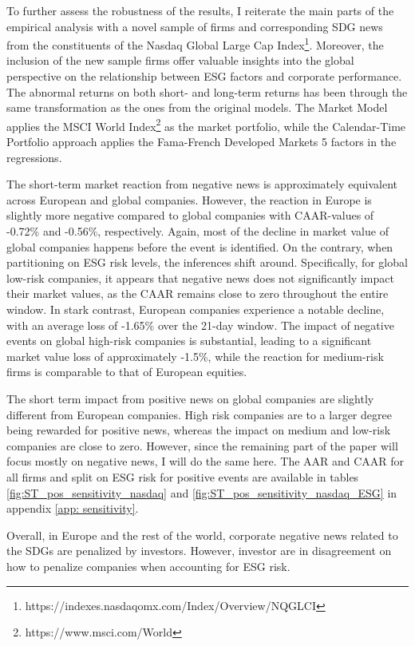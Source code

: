 To further assess the robustness of the results, I reiterate the main parts of the empirical analysis with a novel sample of firms and corresponding SDG news from the constituents of the Nasdaq Global Large Cap Index\footnote{https://indexes.nasdaqomx.com/Index/Overview/NQGLCI}. Moreover, the inclusion of the new sample firms offer valuable insights into the global perspective on the relationship between ESG factors and corporate performance. The abnormal returns on both short- and long-term returns has been through the same transformation as the ones from the original models. The Market Model applies the MSCI World Index\footnote{https://www.msci.com/World} as the market portfolio, while the Calendar-Time Portfolio approach applies the Fama-French Developed Markets 5 factors in the regressions. 

The short-term market reaction from negative news is approximately equivalent across European and global companies. However, the reaction in Europe is slightly more negative compared to global companies with CAAR-values of -0.72\% and -0.56\%, respectively. Again, most of the decline in market value of global companies happens before the event is identified. On the contrary, when partitioning on ESG risk levels, the inferences shift around. Specifically, for global low-risk companies, it appears that negative news does not significantly impact their market values, as the CAAR remains close to zero throughout the entire window. In stark contrast, European companies experience a notable decline, with an average loss of -1.65\% over the 21-day window. 
The impact of negative events on global high-risk companies is substantial, leading to a significant market value loss of approximately -1.5\%, while the reaction for medium-risk firms is comparable to that of European equities.

The short term impact from positive news on global companies are slightly different from European companies. High risk companies are to a larger degree being rewarded for positive news, whereas the impact on medium and low-risk companies are close to zero. However, since the remaining part of the paper will focus mostly on negative news, I will do the same here. The AAR and CAAR for all firms and split on ESG risk for positive events are available in tables \ref{fig:ST_pos_sensitivity_nasdaq} and \ref{fig:ST_pos_sensitivity_nasdaq_ESG} in appendix \ref{app: sensitivity}.

Overall, in Europe and the rest of the world, corporate negative news related to the SDGs are penalized by investors. However, investor are in disagreement on how to penalize companies when accounting for ESG risk.  

